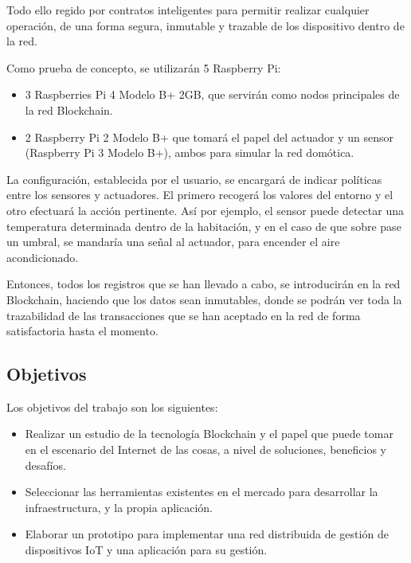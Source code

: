 \vspace{5mm}

\noindent Todo ello regido por contratos inteligentes para permitir realizar cualquier operación, de una forma segura, 
inmutable y trazable de los dispositivo dentro de la red.

\vspace{20mm}

\noindent Como prueba de concepto, se utilizarán 5 Raspberry Pi: 

\begin{itemize}
	\item 3 Raspberries Pi 4 Modelo B+ 2GB, que servirán como nodos principales de la red Blockchain.
	\item 2 Raspberry Pi 2 Modelo B+ que tomará el papel del actuador y un sensor (Raspberry Pi 3 Modelo B+), ambos 
	para simular la red domótica.
\end{itemize}

\noindent La configuración, establecida por el usuario, se encargará de indicar políticas entre los sensores 
y actuadores. El primero recogerá los valores del entorno y el otro efectuará la acción pertinente. Así por ejemplo, 
el sensor puede detectar una temperatura determinada dentro de la habitación, y en el caso de que sobre pase un 
umbral, se mandaría una señal al actuador, para encender el aire acondicionado.

\vspace{5mm}

\noindent Entonces, todos los registros que se han llevado a cabo, se introducirán en la red Blockchain, haciendo que 
los datos sean inmutables, donde se podrán ver toda la trazabilidad de las transacciones que se han aceptado en la red 
de forma satisfactoria hasta el momento.

\subsection{Objetivos}

Los objetivos del trabajo son los siguientes:

\begin{itemize}
    \item Realizar un estudio de la tecnología Blockchain y el papel que puede tomar en el escenario del Internet de 
    las cosas, a nivel de soluciones, beneficios y desafíos. 
    \item Seleccionar las herramientas existentes en el mercado para desarrollar la infraestructura, y la propia 
    aplicación.
    \item Elaborar un prototipo para implementar una red distribuida de gestión de dispositivos IoT y una aplicación
    para su gestión.
\end{itemize}

